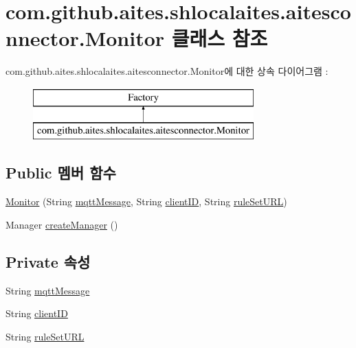 \hypertarget{classcom_1_1github_1_1aites_1_1shlocalaites_1_1aitesconnector_1_1_monitor}{}\section{com.\+github.\+aites.\+shlocalaites.\+aitesconnector.\+Monitor 클래스 참조}
\label{classcom_1_1github_1_1aites_1_1shlocalaites_1_1aitesconnector_1_1_monitor}
com.\+github.\+aites.\+shlocalaites.\+aitesconnector.\+Monitor에 대한 상속 다이어그램 \+: \begin{figure}[H]
\begin{center}
\leavevmode
\includegraphics[height=2.000000cm]{classcom_1_1github_1_1aites_1_1shlocalaites_1_1aitesconnector_1_1_monitor}
\end{center}
\end{figure}
\subsection*{Public 멤버 함수}
\begin{DoxyCompactItemize}
\item 
\mbox{\hyperlink{classcom_1_1github_1_1aites_1_1shlocalaites_1_1aitesconnector_1_1_monitor_a8a2fe3628e8d440249635e65e57cd780}{Monitor}} (String \mbox{\hyperlink{classcom_1_1github_1_1aites_1_1shlocalaites_1_1aitesconnector_1_1_monitor_aa114674db8bbf02bddfd924c47b0f37d}{mqtt\+Message}}, String \mbox{\hyperlink{classcom_1_1github_1_1aites_1_1shlocalaites_1_1aitesconnector_1_1_monitor_af90245733de0b510a4d35b1d6e157f78}{client\+ID}}, String \mbox{\hyperlink{classcom_1_1github_1_1aites_1_1shlocalaites_1_1aitesconnector_1_1_monitor_a67ed331ce2b0c4b32190feb1b71ab6e4}{rule\+Set\+U\+RL}})
\item 
Manager \mbox{\hyperlink{classcom_1_1github_1_1aites_1_1shlocalaites_1_1aitesconnector_1_1_monitor_a1bc1f52f594a50a72e630559c7bedabf}{create\+Manager}} ()
\end{DoxyCompactItemize}
\subsection*{Private 속성}
\begin{DoxyCompactItemize}
\item 
String \mbox{\hyperlink{classcom_1_1github_1_1aites_1_1shlocalaites_1_1aitesconnector_1_1_monitor_aa114674db8bbf02bddfd924c47b0f37d}{mqtt\+Message}}
\item 
String \mbox{\hyperlink{classcom_1_1github_1_1aites_1_1shlocalaites_1_1aitesconnector_1_1_monitor_af90245733de0b510a4d35b1d6e157f78}{client\+ID}}
\item 
String \mbox{\hyperlink{classcom_1_1github_1_1aites_1_1shlocalaites_1_1aitesconnector_1_1_monitor_a67ed331ce2b0c4b32190feb1b71ab6e4}{rule\+Set\+U\+RL}}
\end{DoxyCompactItemize}



